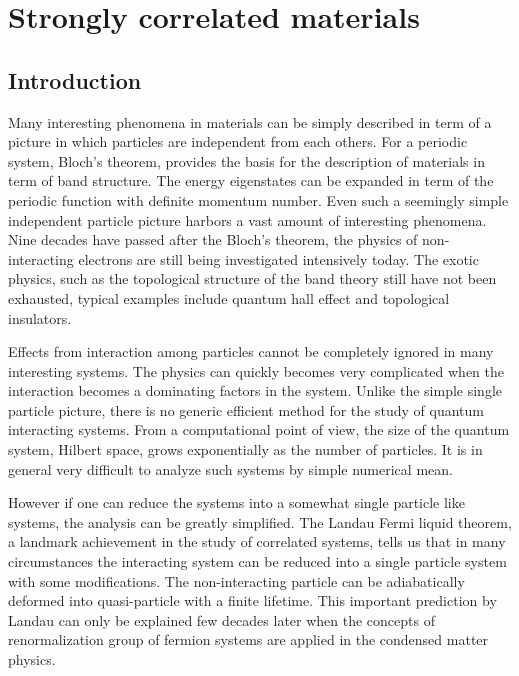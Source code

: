 

\chapter{Strongly correlated materials}
\label{chap:cthyb}
\section{Introduction}

Many interesting phenomena in materials can be simply described in term
of a picture in which particles are independent from each others. For a periodic
system, Bloch's theorem, provides the basis for the description of materials
in term of band structure. The energy eigenstates can be expanded in term
of the periodic function with definite momentum number. Even such a seemingly
simple independent particle picture harbors a vast amount of interesting phenomena.
Nine decades have passed after the Bloch's theorem, the physics of non-interacting electrons are
still being investigated intensively today. The exotic physics, such as 
the topological structure of the band theory still have not been exhausted,
typical examples include quantum hall effect and topological insulators.

Effects from interaction among particles cannot be completely ignored in many
interesting systems. The physics can quickly becomes very complicated when
the interaction becomes a dominating factors in the system. Unlike the simple
single particle picture, there is no generic efficient method for the study 
of quantum interacting systems. From a computational point of view, the size
of the quantum system, Hilbert space, grows exponentially as the number of 
particles. It is in general very difficult to analyze such systems by simple numerical mean.

However if one can reduce the systems into a somewhat single particle like systems,
the analysis can be greatly simplified. The Landau Fermi liquid theorem, a landmark
achievement in the study of correlated systems, tells us that in many
circumstances the interacting system can be reduced into a single particle system with
some modifications. The non-interacting particle can be adiabatically deformed
into quasi-particle with a finite lifetime. This important prediction by Landau
can only be explained few decades later when the concepts of renormalization group
of fermion systems are applied in the condensed matter physics.

